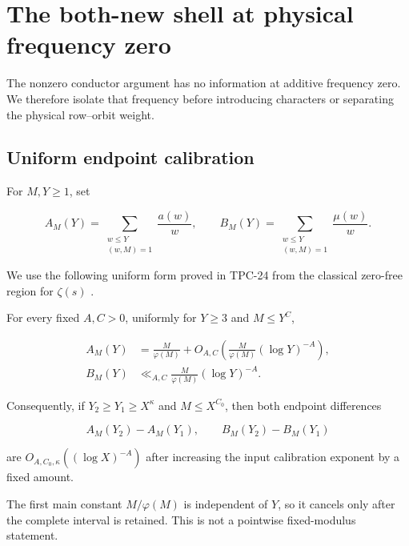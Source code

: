 \section{The both-new shell at physical frequency zero}
\label{sec:tpc26-both-new-zero}

The nonzero conductor argument has no information at additive
frequency zero.  We therefore isolate that frequency before introducing
characters or separating the physical row--orbit weight.

\subsection{Uniform endpoint calibration}

For \(M,Y\ge1\), set

\begin{equation}
 A_M(Y)=
 \sum_{\substack{w\le Y\\(w,M)=1}}\frac{a(w)}w,
 \qquad
 B_M(Y)=
 \sum_{\substack{w\le Y\\(w,M)=1}}\frac{\mu(w)}w.
 \label{eq:tpc26-AB}
\end{equation}

We use the following uniform form proved in TPC-24 from the classical
zero-free region for \(\zeta(s)\) \citep{WangTPC24,IwaniecKowalski2004}.

\begin{lemma}
\label{lem:tpc26-uniform-calibration}
For every fixed \(A,C>0\), uniformly for \(Y\ge3\) and \(M\le Y^C\),

\begin{align}
 A_M(Y)
 &=\frac{M}{\varphi(M)}
 +O_{A,C}\left(
 \frac{M}{\varphi(M)}(\log Y)^{-A}\right),
 \label{eq:tpc26-A-calibration}\\
 B_M(Y)
 &\ll_{A,C}
 \frac{M}{\varphi(M)}(\log Y)^{-A}.
 \label{eq:tpc26-B-calibration}
\end{align}

Consequently, if \(Y_2\ge Y_1\ge X^\kappa\) and
\(M\le X^{C_0}\), then both endpoint differences

\begin{equation}
 A_M(Y_2)-A_M(Y_1),
 \qquad B_M(Y_2)-B_M(Y_1)
 \label{eq:tpc26-endpoint-differences}
\end{equation}

are \(O_{A,C_0,\kappa}((\log X)^{-A})\) after increasing the input
calibration exponent by a fixed amount.
\end{lemma}

The first main constant \(M/\varphi(M)\) is independent of \(Y\), so
it cancels only after the complete interval is retained.  This is not a
pointwise fixed-modulus statement.

